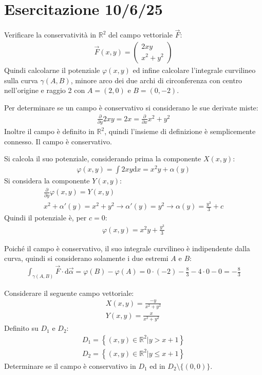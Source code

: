 \documentclass{article}
\newcommand{\df}{\mathrm{d}}
\numberwithin{equation}{subsection}
\begin{document}
\clearpage

\section{Esercitazione 10/6/25}

Verificare la conservatività in $\mathbb{R}^2$ del campo vettoriale  $\vec{F}$:
\begin{gather*}
    \vec{F}(x,y)=\begin{pmatrix}
        2xy\\x^2+y^2
    \end{pmatrix}
\end{gather*}
Quindi calcolarne il potenziale $\varphi(x,y)$ ed infine calcolare l'integrale curvilineo sulla curva $\gamma(A,B)$, minore arco dei due archi di circonferenza con centro nell'origine e raggio 2 con $A=(2,0)$ e $B=(0,-2)$. 

Per determinare se un campo è conservativo si considerano le sue derivate miste:
\begin{gather*}
    \frac{\partial}{\partial y}2xy=2x=\frac{\partial}{\partial x}x^2+y^2
\end{gather*}
Inoltre il campo è definito in $\mathbb{R}^2$, quindi l'insieme di definizione è semplicemente connesso. Il campo è conservativo. 

Si calcola il suo potenziale, considerando prima la componente $X(x,y)$:
\begin{gather*}
    \varphi(x,y)=\int 2xy\df x=x^2y+\alpha(y)
\end{gather*}
Si considera la componente $Y(x,y)$:
\begin{gather*}
    \frac{\partial}{\partial y}\varphi(x,y)=Y(x,y)\\
    x^2+\alpha'(y)=x^2+y^2\to\alpha'(y)=y^2\to\alpha(y)=\frac{y^3}{3}+c
\end{gather*}
Quindi il potenziale è, per $c=0$:
\begin{gather*}
    \varphi(x,y)=x^2y+\frac{y^3}{3}
\end{gather*}

Poiché il campo è conservativo, il suo integrale curvilineo è indipendente dalla curva, quindi si considerano solamente i due estremi $A$ e $B$:
\begin{gather*}
    \int_{\gamma(A,B)}\vec{F}\cdot\df\vec{\alpha}=\varphi(B)-\varphi(A)=0\cdot(-2)-\frac{8}{3}-4\cdot0-0=-\frac{8}{3}
\end{gather*}



Considerare il seguente campo vettoriale:
\begin{gather*}
    X(x,y)=\frac{-y}{x^2+y^2}\\
    Y(x,y)=\frac{x}{x^2+y^2}
\end{gather*}
Definito su $D_1$ e $D_2$:
\begin{gather*}
    D_1=\left\{(x,y)\in\mathbb{R}^2\big|y>x+1\right\}\\
    D_2=\left\{(x,y)\in\mathbb{R}^2\big|y\leq x+1\right\}
\end{gather*}
Determinare se il campo è conservativo in $D_1$ ed in $D_2\setminus\{(0,0)\}$. 
\end{document}
